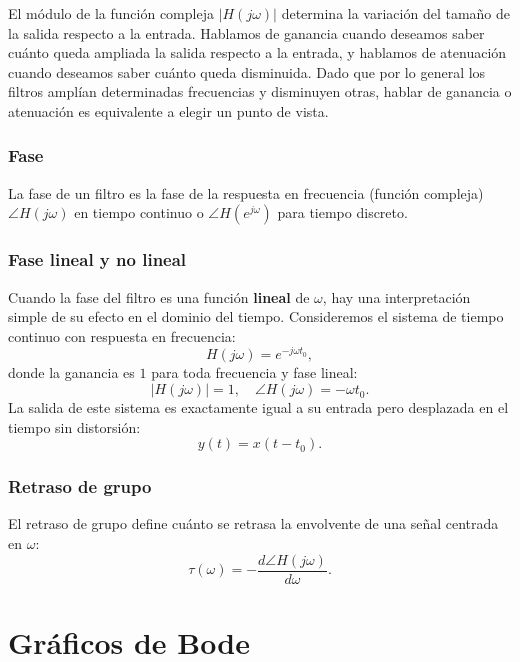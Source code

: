 \documentclass[11pt,a4paper,openany]{book}
\begin{document}
El m\'{o}dulo de la funci\'{o}n compleja $|H(j\omega)|$ determina la variaci\'{o}n del tama\~{n}o de la salida respecto a la entrada. Hablamos de ganancia cuando deseamos saber cu\'{a}nto queda ampliada la salida respecto a la entrada, y hablamos de atenuaci\'{o}n cuando deseamos saber cu\'{a}nto queda disminuida. Dado que por lo general los filtros ampl\'{i}an determinadas frecuencias y disminuyen otras, hablar de ganancia o atenuaci\'{o}n es equivalente a elegir un punto de vista.

\subsubsection{Fase}
La fase de un filtro es la fase de la respuesta en frecuencia (funci\'{o}n compleja) $\angle H(j\omega)$ en tiempo continuo o $\angle H(e^{j\omega})$ para tiempo discreto.

\subsubsection{Fase lineal y no lineal}
Cuando la fase del filtro es una funci\'{o}n \textbf{lineal} de $\omega$, hay una interpretaci\'{o}n simple de su efecto en el dominio del tiempo. Consideremos el sistema de tiempo continuo con respuesta en frecuencia:
\begin{equation}
	H(j\omega) = e^{-j\omega t_{0}},
\end{equation}
donde la ganancia es $1$ para toda frecuencia y fase lineal:
\begin{equation}
	|H(j\omega)| = 1, \quad \angle H(j\omega) = -\omega t_{0}.
\end{equation}
La salida de este sistema es exactamente igual a su entrada pero desplazada en el tiempo sin distorsi\'{o}n:
\begin{equation}
	y(t) = x(t - t_{0}).
\end{equation}

\subsubsection{Retraso de grupo}
El retraso de grupo define cu\'{a}nto se retrasa la envolvente de una se\~{n}al centrada en $\omega$:
\begin{equation}
	\tau(\omega) = -\frac{d \angle H(j\omega)}{d\omega}.
\end{equation}

\section{Gr\'{a}ficos de Bode}
\end{document}
